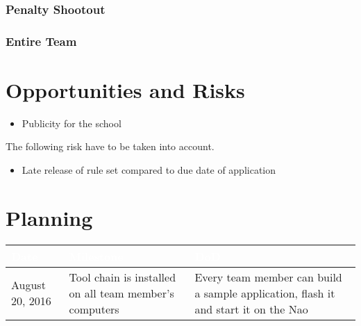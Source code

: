 \documentclass[12pt]{article}
\theoremstyle{definition}
\newcommand{\unclear}[1]{\vspace{.5em}\parbox{.9\linewidth}{\color{red}{\bf Remark: #1}}\vspace{.5em}}
\begin{document}
 \unclear{I am very unsure what you want to bring into these next two subsubsections}
\subsubsection{Penalty Shootout}

\subsubsection{Entire Team}

\section{Opportunities and Risks}
\begin{itemize}
\item Publicity for the school
\end{itemize}

The following risk have to be taken into account.
\begin{itemize}
\item Late release of rule set compared to due date of application
\end{itemize}

\section{Planning}
\unclear{Please fill up with some 7 to 10 more milestones}

\begin{tabular}{|p{}|p{}|p{}|}
\hline
\cellcolor[gray]{0.5}\textcolor{white}{Date} & \cellcolor[gray]{0.45}\textcolor{white}{Milestone} & \cellcolor[gray]{0.5}\textcolor{white}{DoD} \\ \hline
August 20, 2016 & Tool chain is installed on all team member's computers & Every team member can build a sample application, flash it and start it on the Nao\\ \hline
\end{tabular}
{}
\end{document}
